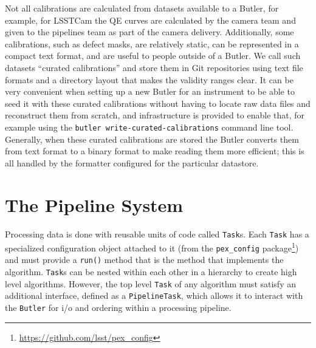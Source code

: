 \documentclass[]{spie}
\begin{document}
Not all calibrations are calculated from datasets available to a Butler, for example, for LSSTCam the QE curves are calculated by the camera team and given to the pipelines team as part of the camera delivery.
Additionally, some calibrations, such as defect masks, are relatively static, can be represented in a compact text format, and are useful to people outside of a Butler.
We call such datasets ``curated calibrations'' and store them in Git repositories using text file formats and a directory layout that makes the validity ranges clear.
It can be very convenient when setting up a new Butler for an instrument to be able to seed it with these curated calibrations without having to locate raw data files and reconstruct them from scratch, and infrastructure is provided to enable that, for example using the \texttt{butler write-curated-calibrations} command line tool.
Generally, when these curated calibrations are stored the Butler converts them from text format to a binary format to make reading them more efficient; this is all handled by the formatter configured for the particular datastore.

\section{The Pipeline System}

\setcounter{footnote}{0}  %

Processing data is done with reusable units of code called \texttt{Task}s.
Each \texttt{Task} has a specialized configuration object attached to it (from the \texttt{pex\_config} package\footnote{\url{https://github.com/lsst/pex_config}}) and must provide a \texttt{run()} method that is the method that implements the algorithm.
\texttt{Task}s can be nested within each other in a hierarchy to create high level algorithms.
However, the top level \texttt{Task} of any algorithm must satisfy an additional interface, defined as a \texttt{PipelineTask}, which allows it to interact with the \texttt{Butler} for i/o and ordering within a processing pipeline.
\end{document}
